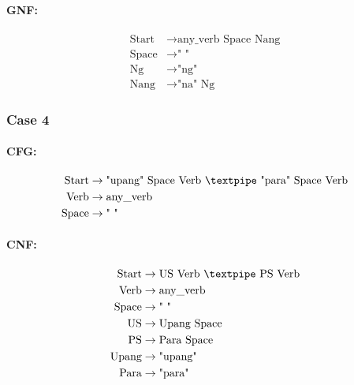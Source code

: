 \paragraph{GNF:}

\begin{equation*}
    \begin{aligned}
        \text{Start} &\rightarrow \text{any\_verb Space Nang} \\
        \text{Space} &\rightarrow \text{" "} \\
        \text{Ng} &\rightarrow \text{"ng"} \\
        \text{Nang} &\rightarrow \text{"na" Ng}
    \end{aligned}
\end{equation*}


\subsubsection{Case 4}

\paragraph{CFG:}

\begin{equation*}
    \begin{aligned}
        \text{Start} &\rightarrow \text{"upang" Space Verb {\textpipe} "para" Space Verb} \\
        \text{Verb} &\rightarrow \text{any\_verb} \\
        \text{Space} &\rightarrow \text{" "}
    \end{aligned}
\end{equation*}

\paragraph{CNF:}

\begin{equation*}
    \begin{aligned}
        \text{Start} &\rightarrow \text{US Verb {\textpipe} PS Verb} \\
        \text{Verb} &\rightarrow \text{any\_verb} \\
        \text{Space} &\rightarrow \text{" "} \\
        \text{US} &\rightarrow \text{Upang Space} \\
        \text{PS} &\rightarrow \text{Para Space} \\
        \text{Upang} &\rightarrow \text{"upang"} \\
        \text{Para} &\rightarrow \text{"para"}
    \end{aligned}
\end{equation*}

